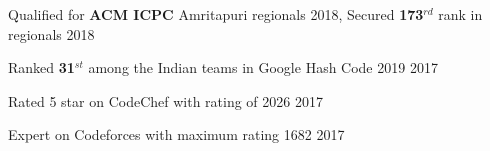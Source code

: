 \begin{cvhonors}
{\Large
  \cvhonor
  {Qualified for \textbf{ACM ICPC} Amritapuri regionals 2018, Secured \textbf{173$^{rd}$} rank in regionals}
  {}
  {2018}
  
  \cvhonor
  {Ranked \textbf{31$^{st}$} among the Indian teams in Google Hash Code 2019}
  {}
  {2017}

  \cvhonor
  {Rated 5 star on CodeChef with rating of 2026}
  {}
  {2017}
  
  \cvhonor
  {Expert on Codeforces with maximum rating 1682}
  {}
  {2017}

}
\end{cvhonors}

